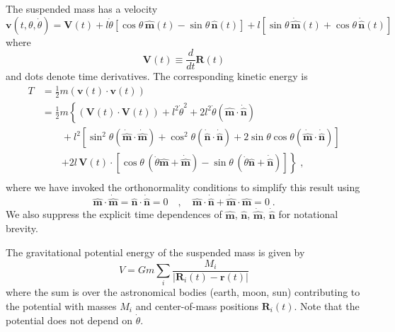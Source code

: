 \documentclass[12pt]{article}
\providecommand{\vecsymbol}[1]{\ensuremath{\boldsymbol{#1}}}
\providecommand{\rv}{\vecsymbol{r}}
\providecommand{\Rv}{\vecsymbol{R}}
\providecommand{\vv}{\vecsymbol{v}}
\providecommand{\Vv}{\vecsymbol{V}}
\providecommand{\mv}{\hat{\vecsymbol{m}}}
\providecommand{\nv}{\hat{\vecsymbol{n}}}
\providecommand{\thdot}{\dot{\theta}}
\begin{document}
The suspended mass has a velocity
\begin{equation}
\vv(t,\theta,\thdot) = \Vv(t) + l\thdot \left[ \cos\theta\,\mv(t) - \sin\theta\,\nv(t) \right]
+ l \left[ \sin\theta\,\dot{\mv}(t) + \cos\theta\,\dot{\nv}(t) \right]
\end{equation}
where
\begin{equation}
\Vv(t) \equiv \frac{d}{dt}\Rv(t)
\end{equation}
and dots denote time derivatives. The corresponding kinetic energy is
\begin{equation}
\begin{split}
T &= \frac{1}{2} m \left( \vv(t)\cdot \vv(t) \right) \\
&= \frac{1}{2} m \left\{ (\Vv(t)\cdot\Vv(t)) + l^2\thdot^2 + 2l^2\thdot (\mv\cdot\dot{\nv}) \right. \\
&\qquad + l^2 \left[\sin^2\theta (\dot{\mv}\cdot\dot{\mv}) + \cos^2\theta (\dot{\nv}\cdot\dot{\nv}) +
2 \sin\theta\cos\theta (\dot{\mv}\cdot\dot{\nv}) \right] \\
&\qquad \left. +2 l\,\Vv(t)\cdot\left[ \cos\theta\,(\thdot \mv+\dot{\mv}) -
\sin\theta\,(\thdot \nv+\dot{\nv})\right] \right\} \; , \\ 
\end{split}
\end{equation}
where we have invoked the orthonormality conditions to simplify this result using
\begin{equation}
\mv\cdot\dot{\mv} = \nv\cdot\dot{\nv} = 0 \quad , \quad
\mv\cdot\dot{\nv} + \dot{\mv}\cdot\mv = 0 \; .
\end{equation}
We also suppress the explicit time dependences of $\mv$, $\nv$, $\dot{\mv}$, $\dot{\nv}$ for notational brevity.

The gravitational potential energy of the suspended mass is given by
\begin{equation}
V = G m \sum_i \frac{M_i}{\left| \Rv_i(t) - \rv(t) \right|}
\end{equation}
where the sum is over the astronomical bodies (earth, moon, sun) contributing to the potential with masses $M_i$ and center-of-mass positions $\Rv_i(t)$. Note that the potential does not depend on $\thdot$.
\end{document}
